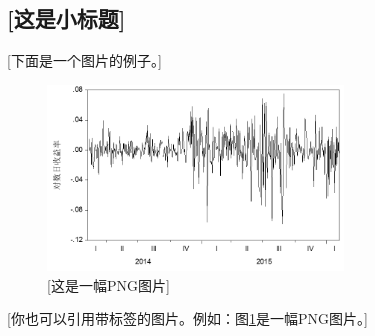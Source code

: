 \documentclass[a4paper,11pt,onecolumn,twoside]{article}
\begin{document}
\subsection{[这是小标题]}
 [下面是一个图片的例子。]
\begin{figure}[H]
  \centering
  \includegraphics[width=0.7\textwidth]{figures/fig1.png}
  \caption{[这是一幅PNG图片]} \label{pngsample}
\end{figure}

[你也可以引用带标签的图片。例如：图\ref{pngsample}是一幅PNG图片。]
\end{document}
